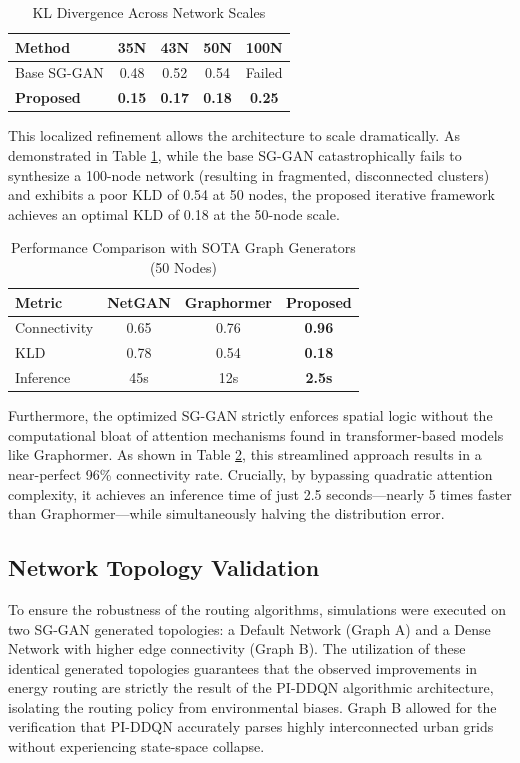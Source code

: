 \documentclass[journal, a4paper, twocolumn]{IEEEtran}
\begin{document}
\begin{table}[htbp]
\centering
\caption{KL Divergence Across Network Scales}
\label{tab:kld_scalability}
\footnotesize
\begin{tabular}{@{}lcccc@{}}
\toprule
\textbf{Method} & \textbf{35N} & \textbf{43N} & \textbf{50N} & \textbf{100N} \\ \midrule
Base SG-GAN & 0.48 & 0.52 & 0.54 & Failed \\ 
\textbf{Proposed} & \textbf{0.15} & \textbf{0.17} & \textbf{0.18} & \textbf{0.25} \\ \bottomrule
\end{tabular}
\end{table}

This localized refinement allows the architecture to scale dramatically. As demonstrated in Table \ref{tab:kld_scalability}, while the base SG-GAN catastrophically fails to synthesize a 100-node network (resulting in fragmented, disconnected clusters) and exhibits a poor KLD of 0.54 at 50 nodes, the proposed iterative framework achieves an optimal KLD of 0.18 at the 50-node scale.

\begin{table}[htbp]
\centering
\caption{Performance Comparison with SOTA Graph Generators (50 Nodes)}
\label{tab:graph_generation_sota}
\footnotesize
\begin{tabular}{@{}lccc@{}}
\toprule
\textbf{Metric} & \textbf{NetGAN} & \textbf{Graphormer} & \textbf{Proposed} \\ \midrule
Connectivity & 0.65 & 0.76 & \textbf{0.96} \\ 
KLD & 0.78 & 0.54 & \textbf{0.18} \\ 
Inference & 45s & 12s & \textbf{2.5s} \\ \bottomrule
\end{tabular}
\end{table}

Furthermore, the optimized SG-GAN strictly enforces spatial logic without the computational bloat of attention mechanisms found in transformer-based models like Graphormer. As shown in Table \ref{tab:graph_generation_sota}, this streamlined approach results in a near-perfect 96\% connectivity rate. Crucially, by bypassing quadratic attention complexity, it achieves an inference time of just 2.5 seconds---nearly 5 times faster than Graphormer---while simultaneously halving the distribution error.

\subsection{Network Topology Validation}
To ensure the robustness of the routing algorithms, simulations were executed on two SG-GAN generated topologies: a Default Network (Graph A) and a Dense Network with higher edge connectivity (Graph B). The utilization of these identical generated topologies guarantees that the observed improvements in energy routing are strictly the result of the PI-DDQN algorithmic architecture, isolating the routing policy from environmental biases. Graph B allowed for the verification that PI-DDQN accurately parses highly interconnected urban grids without experiencing state-space collapse.
\end{document}
